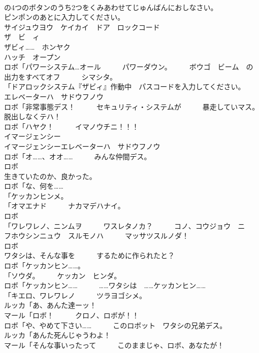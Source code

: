 \documentclass[8pt]{extreport}
\begin{document}
\begin{CJK}{UTF8}{min}
\\	の4つのボタンのうち2つをくみあわせてじゅんばんにおしなさい。	
\\	ピンポンのあとに入力してください。	
\\	サイジュウヨウ　ケイカイ　ドア　ロックコード　
\\	ザ　ビ　ィ	
\\	ザビィ……　ホンヤク
\\	ハッチ　オープン	
\\	ロボ「パワーシステム…オール　　　パワーダウン。　　　ボウゴ　ビーム　の出力をすべてオフ　　　シマシタ。	
\\	「ドアロックシステム『ザビィ』作動中　パスコードを入力してください。	
\\	エレベーターハ　サドウフノウ	
\\	ロボ「非常事態デス！　　　セキュリティ・システムが　　　暴走していマス。　脱出しなくテハ！	
\\	ロボ「ハヤク！　　　イマノウチニ！！！	
\\	イマージェンシー	
\\	イマージェンシーエレベーターハ　サドウフノウ	
\\	ロボ「オ……、オオ……　　　みんな仲間デス。	
\\	ロボ
\\	生きていたのか、良かった。	
\\	ロボ「な、何を……	
\\	「ケッカンヒンメ。
\\	「オマエナド　　　ナカマデハナイ。	
\\	ロボ
\\	「ワレワレノ、ニンムヲ　　　ワスレタノカ？　　　コノ、コウジョウ　ニ　　　フホウシンニュウ　スルモノハ　　　マッサツスルノダ！	
\\	ロボ
\\	ワタシは、そんな事を　　　するために作られたと？	
\\	ロボ「ケッカンヒン……。
\\	「ソウダ。　　　ケッカン　ヒンダ。	
\\	ロボ「ケッカンヒン……　　　……ワタシは　……ケッカンヒン……	
\\	「キエロ、ワレワレノ　　　ツラヨゴシメ。	
\\	ルッカ「あ、あんた達ーッ！	
\\	マール「ロボ！　　　クロノ、ロボが！！	
\\	ロボ「や、やめて下さい……　　　このロボット　ワタシの兄弟デス。	
\\	ルッカ「あんた死んじゃうわよ！	
\\	マール「そんな事いったって　　　このままじゃ、ロボ、あなたが！	

\end{CJK}
\end{document}
